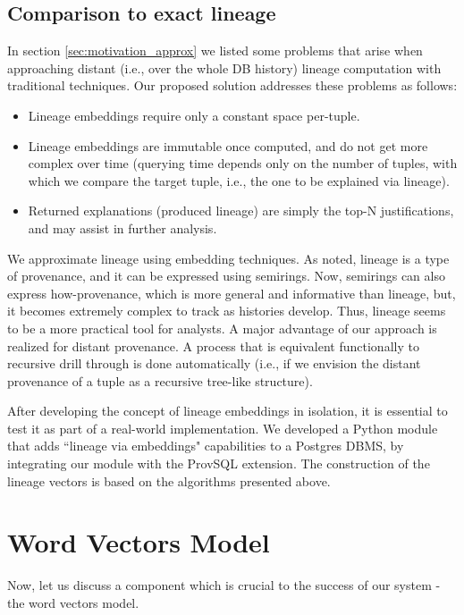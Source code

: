 \subsection{Comparison to exact lineage} In section \ref{sec:motivation_approx} we listed some problems that arise when approaching distant (i.e., over the whole DB history) lineage computation with traditional techniques. Our proposed solution addresses these problems as follows:
\begin{itemize}
    \item Lineage embeddings require only a constant space per-tuple.
    \item Lineage embeddings are immutable once computed, and do not get more complex over time (querying time depends only on the number of tuples, with which we compare the target tuple, i.e., the one to be explained via lineage).
    \item Returned explanations (produced lineage) are simply the top-N justifications, and may assist in further analysis.
\end{itemize}
We approximate lineage using embedding techniques. As noted, lineage is a type of provenance, and it can be expressed using semirings. Now, semirings can also express how-provenance, which is more general and informative than lineage, but, it becomes extremely complex to track as histories develop. Thus, lineage seems to be a more practical tool for analysts.
A major advantage of our approach is realized for distant provenance. A process that is equivalent functionally to recursive drill through is done automatically (i.e., if we envision the distant provenance of a tuple as a recursive tree-like structure).\\

\par After developing the concept of lineage embeddings in isolation, it is essential to test it as part of a real-world implementation. We developed a Python module that adds ``lineage via embeddings" capabilities to a Postgres DBMS, by integrating our module with the ProvSQL \cite{Senellart2018} extension. The construction of the lineage vectors is based on the algorithms presented above.


\section{Word Vectors Model}\label{sec:latent_wv_model}
Now, let us discuss a component which is crucial to the success of our system - the word vectors model. \\
